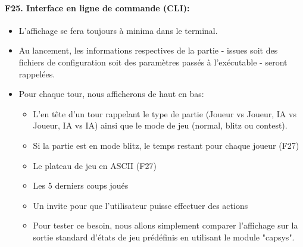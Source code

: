 \documentclass[a4paper,12pt]{article}
\begin{document}
\paragraph{F25. Interface en ligne de commande (CLI):}
\begin{itemize}
  \item L'affichage se fera toujours à minima dans le terminal.
  \item Au lancement, les informations respectives de la partie - issues soit des
        fichiers de configuration soit des paramètres passés à l'exécutable - seront
        rappelées.
  \item Pour chaque tour, nous afficherons de haut en bas:
        \begin{itemize}
          \item L'en tête d'un tour rappelant le type de partie (Joueur vs Joueur, IA vs
                Joueur, IA vs IA) ainsi que le mode de jeu (normal, blitz ou contest).
          \item Si la partie est en mode blitz, le temps restant pour chaque joueur (F27)
          \item Le plateau de jeu en ASCII (F27)
          \item Les 5 derniers coups joués
          \item Un invite pour que l'utilisateur puisse effectuer des actions
          \item Pour tester ce besoin, nous allons simplement comparer l'affichage sur la
                sortie standard d'états de jeu prédéfinis en utilisant le module "capsys".
        \end{itemize}
\end{itemize}
\end{document}
